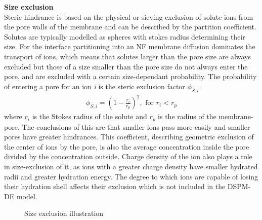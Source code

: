 
\textbf{Size exclusion}\\
Steric hindrance is based on the physical or sieving exclusion of solute ions from the pore walls of the membrane and can be described by the partition coefficient.
Solutes are typically modelled as spheres with stokes radius determining their size.
For the interface partitioning into an NF membrane diffusion dominates the transport of ions, which means that solutes larger than the pore size are always excluded but those of a size smaller than the pore size do not always enter the pore, and are excluded with a certain size-dependant probability. \citep{wangPoreModelNanofiltration2021}
The probability of entering a pore for an ion \textit{i} is the steric exclusion factor $\phi_{S,i}$.  
\begin{align}
\phi_{S,i} = \left(1-\frac{r_i}{r_p}\right)^2, \text{ for  $r_i < r_p$}
\end{align}
where $r_i$ is the Stokes radius of the solute and $r_p$ is the radius of the membrane-pore.
The conclusions of this are that smaller ions pass more easily and smaller pores have greater hindrances. 
This coefficient, describing geometric exclusion of the center of ions by the pore, is also the average concentration inside the pore divided by the concentration outside. \citep{nanofiltration_2021_bog_fraMorten}
Charge density of the ion also plays a role in size-exclusion of it, as ions with a greater charge density have smaller hydrated radii and greater hydration energy.
The degree to which ions are capable of losing their hydration shell affects their exclusion which is not included in the DSPM-DE model.  \citep{wangPoreModelNanofiltration2021}

\begin{figure}[H]
    \centering
    
    \caption{Size exclusion illustration}
    \label{fig:size_exclusion}
\end{figure}

